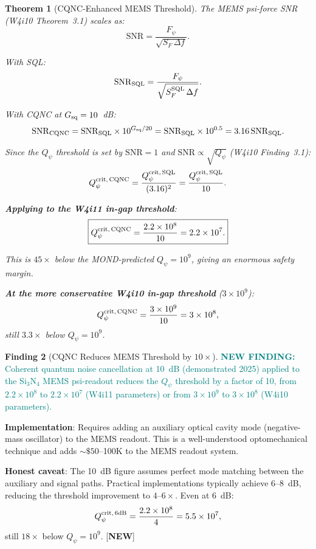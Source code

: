 \documentclass[11pt]{article}
\newcommand{\ee}[1]{\times 10^{#1}}
\newcommand{\Qpsi}{Q_\psi}
\newcommand{\SNR}{\mathrm{SNR}}
\newcommand{\newfinding}[1]{\textcolor{teal}{\textbf{NEW FINDING:} #1}}
\newtheorem{theorem}{Theorem}[section]
\theoremstyle{definition}
\newtheorem{finding}[theorem]{Finding}
\theoremstyle{remark}
\begin{document}
\begin{theorem}[CQNC-Enhanced MEMS Threshold]
\label{thm:CQNC}
The MEMS psi-force SNR (W4i10 Theorem~3.1) scales as:
\begin{equation}
\SNR = \frac{F_\psi}{\sqrt{S_F\,\Delta f}}.
\label{eq:SNR_force}
\end{equation}

With SQL:
\begin{equation}
\SNR_{\rm SQL} = \frac{F_\psi}{\sqrt{S_F^{\rm SQL}\,\Delta f}}.
\end{equation}

With CQNC at $G_{\rm sq} = 10$~dB:
\begin{equation}
\SNR_{\rm CQNC} = \SNR_{\rm SQL}\times 10^{G_{\rm sq}/20}
= \SNR_{\rm SQL}\times 10^{0.5} = 3.16\,\SNR_{\rm SQL}.
\label{eq:SNR_CQNC}
\end{equation}

Since the $\Qpsi$ threshold is set by $\SNR = 1$ and $\SNR \propto
\sqrt{\Qpsi}$ (W4i10 Finding~3.1):
\begin{equation}
\Qpsi^{\rm crit,\,CQNC} = \frac{\Qpsi^{\rm crit,\,SQL}}{(3.16)^2}
= \frac{\Qpsi^{\rm crit,\,SQL}}{10}.
\label{eq:Qpsi_CQNC}
\end{equation}

\textbf{Applying to the W4i11 in-gap threshold}:
\begin{equation}
\boxed{
\Qpsi^{\rm crit,\,CQNC} = \frac{2.2\ee{8}}{10} = 2.2\ee{7}.
}
\label{eq:Qpsi_CQNC_numerical}
\end{equation}

This is $45\times$ below the MOND-predicted $\Qpsi = 10^9$, giving
an enormous safety margin.

\textbf{At the more conservative W4i10 in-gap threshold} ($3\ee{9}$):
\begin{equation}
\Qpsi^{\rm crit,\,CQNC} = \frac{3\ee{9}}{10} = 3\ee{8},
\end{equation}
still $3.3\times$ below $\Qpsi = 10^9$.
\end{theorem}

\begin{finding}[CQNC Reduces MEMS Threshold by $10\times$]
\label{find:CQNC}
\newfinding{Coherent quantum noise cancellation at 10~dB (demonstrated
2025) applied to the Si$_3$N$_4$ MEMS psi-readout reduces the $\Qpsi$
threshold by a factor of 10, from $2.2\ee{8}$ to $2.2\ee{7}$ (W4i11
parameters) or from $3\ee{9}$ to $3\ee{8}$ (W4i10 parameters).}

\textbf{Implementation}: Requires adding an auxiliary optical cavity
mode (negative-mass oscillator) to the MEMS readout. This is a
well-understood optomechanical technique and adds $\sim\$50$--100K
to the MEMS readout system.

\textbf{Honest caveat}: The 10~dB figure assumes perfect mode matching
between the auxiliary and signal paths. Practical implementations
typically achieve 6--8~dB, reducing the threshold improvement to
$4$--$6\times$. Even at 6~dB:
\begin{equation}
\Qpsi^{\rm crit,\,6dB} = \frac{2.2\ee{8}}{4} = 5.5\ee{7},
\end{equation}
still $18\times$ below $\Qpsi = 10^9$.
[\textbf{NEW}]
\end{finding}
\end{document}

